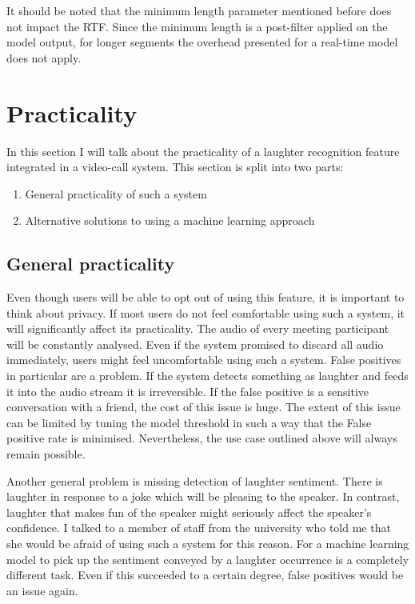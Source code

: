 \documentclass[bsc,frontabs,parskip,deptreport]{infthesis}
\begin{document}
It should be noted that the minimum length parameter mentioned before does not impact the RTF. 
Since the minimum length is a post-filter applied on the model output, for longer segments the overhead presented for a real-time model does not apply. 


\chapter{Practicality}
In this section I will talk about the practicality of a laughter recognition feature integrated in a video-call system. 
This section is split into two parts: 
\begin{enumerate}
    \item General practicality of such a system
    \item Alternative solutions to using a machine learning approach 
\end{enumerate}

\section{General practicality} \label{sec:general-pract}
Even though users will be able to opt out of using this feature, it is important to think about privacy. If most users do not feel comfortable using such a system, it will significantly affect its practicality.  
The audio of every meeting participant will be constantly analysed. Even if the system promised to discard all audio immediately, users might feel uncomfortable using such a system. False positives in particular are a problem. If the system detects something as laughter and feeds it into the audio stream it is irreversible. If the false positive is a sensitive conversation with a friend, the cost of this issue is huge. 
The extent of this issue can be limited by tuning the model threshold in such a way that the False positive rate is minimised. Nevertheless, the use case outlined above will always remain possible. 

Another general problem is missing detection of laughter sentiment. There is laughter in response to a joke which will be pleasing to the speaker. In contrast, laughter that makes fun of the speaker might seriously affect the speaker's confidence. I talked to a member of staff from the university who told me that she would be afraid of using such a system for this reason. 
For a machine learning model to pick up the sentiment conveyed by a laughter occurrence is a completely different task. Even if this succeeded to a certain degree, false positives would be an issue again. 
\end{document}
